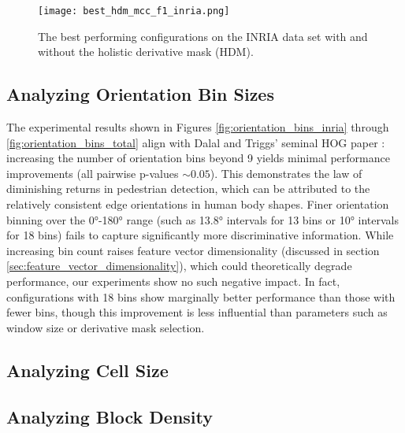 \begin{figure}
    \texttt{[image: best\_hdm\_mcc\_f1\_inria.png]}
    \caption{
        The best performing configurations on the INRIA data set with and without the holistic derivative mask (HDM). 
    }
    \label{fig:best_hdm_inria}
\end{figure}


\subsection{Analyzing Orientation Bin Sizes}

The experimental results shown in Figures \ref{fig:orientation_bins_inria} through \ref{fig:orientation_bins_total} align with Dalal and Triggs' seminal HOG paper \cite{dalal_2005_histograms}: increasing the number of orientation bins beyond 9 yields minimal performance improvements (all pairwise p-values $\sim 0.05$). This demonstrates the law of diminishing returns in pedestrian detection, which can be attributed to the relatively consistent edge orientations in human body shapes. Finer orientation binning over the 0°-180° range (such as 13.8° intervals for 13 bins or 10° intervals for 18 bins) fails to capture significantly more discriminative information. While increasing bin count raises feature vector dimensionality (discussed in section \ref{sec:feature_vector_dimensionality}), which could theoretically degrade performance, our experiments show no such negative impact. In fact, configurations with 18 bins show marginally better performance than those with fewer bins, though this improvement is less influential than parameters such as window size or derivative mask selection.

\subsection{Analyzing Cell Size}


\subsection{Analyzing Block Density}